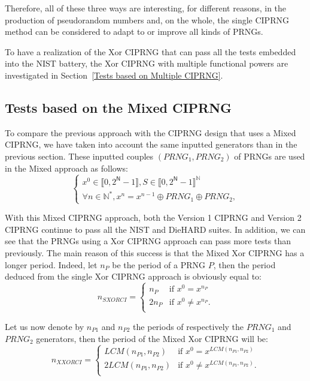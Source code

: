 Therefore, all of these three ways are interesting, for different reasons, in the production of pseudorandom numbers and,
on the whole, the single CIPRNG method can be considered to adapt to or improve all kinds of PRNGs.

To have a realization of the Xor CIPRNG that can pass all the tests embedded into the NIST battery, the Xor CIPRNG with multiple functional powers are investigated in Section~\ref{Tests based on Multiple CIPRNG}.



\subsection{Tests based on the Mixed CIPRNG}

To compare the previous approach with the CIPRNG design that uses a Mixed CIPRNG, we have taken into account the same inputted generators than in the previous section.
These inputted couples $(PRNG_1,PRNG_2)$ of PRNGs are used in the Mixed approach as follows:
\begin{equation}
\left\{
\begin{array}{l}
x^0 \in \llbracket 0, 2^\mathsf{N}-1 \rrbracket, S \in \llbracket 0, 2^\mathsf{N}-1 \rrbracket^\mathds{N} \\
\forall n \in \mathds{N}^*, x^n = x^{n-1} \oplus PRNG_1\oplus PRNG_2,
\end{array}
\right.
\label{equation Oplus}
\end{equation}

With this Mixed CIPRNG approach, both the Version 1 CIPRNG and Version 2 CIPRNG continue to pass all the NIST and DieHARD suites.
In addition, we can see that the PRNGs using a Xor CIPRNG approach can pass more tests than previously.
The main reason of this success is that the Mixed Xor CIPRNG has a longer period.
Indeed, let $n_{P}$ be the period of a PRNG $P$, then the period deduced from the single Xor CIPRNG approach is obviously equal to:
\begin{equation}
n_{SXORCI}=
\left\{
\begin{array}{ll}
n_{P}&\text{if~}x^0=x^{n_{P}}\\
2n_{P}&\text{if~}x^0\neq x^{n_{P}}.\\
\end{array}
\right.
\label{equation Oplus}
\end{equation}

Let us now denote by $n_{P1}$ and $n_{P2}$ the periods of respectively the $PRNG_1$ and $PRNG_2$ generators, then the period of the Mixed Xor CIPRNG will be:
\begin{equation}
n_{XXORCI}=
\left\{
\begin{array}{ll}
LCM(n_{P1},n_{P2})&\text{if~}x^0=x^{LCM(n_{P1},n_{P2})}\\
2LCM(n_{P1},n_{P2})&\text{if~}x^0\neq x^{LCM(n_{P1},n_{P2})}.\\
\end{array}
\right.
\label{equation Oplus}
\end{equation}

